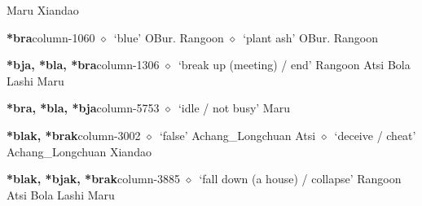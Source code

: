 \hspace{1ex}
         Maru 
\hspace{1ex}
         Xiandao 
  \item {\footnotesize \textbf{*bra}}{\tiny column-1060}
         $\diamond$~`blue'
         OBur. 
\hspace{1ex}
         Rangoon 
\hspace{1ex}
         $\diamond$~`plant ash'
         OBur. 
\hspace{1ex}
         Rangoon 
  \item {\footnotesize \textbf{*bja, *bla, *bra}}{\tiny column-1306}
         $\diamond$~`break up (meeting) / end'
         Rangoon 
\hspace{1ex}
         Atsi 
\hspace{1ex}
         Bola 
\hspace{1ex}
         Lashi 
\hspace{1ex}
         Maru 
  \item {\footnotesize \textbf{*bra, *bla, *bja}}{\tiny column-5753}
         $\diamond$~`idle / not busy'
         Maru 
  \item {\footnotesize \textbf{*blak, *brak}}{\tiny column-3002}
         $\diamond$~`false'
         Achang\_Longchuan 
\hspace{1ex}
         Atsi 
\hspace{1ex}
         $\diamond$~`deceive / cheat'
         Achang\_Longchuan 
\hspace{1ex}
         Xiandao 
  \item {\footnotesize \textbf{*blak, *bjak, *brak}}{\tiny column-3885}
         $\diamond$~`fall down (a house) / collapse'
         Rangoon 
\hspace{1ex}
         Atsi 
\hspace{1ex}
         Bola 
\hspace{1ex}
         Lashi 
\hspace{1ex}
         Maru 
